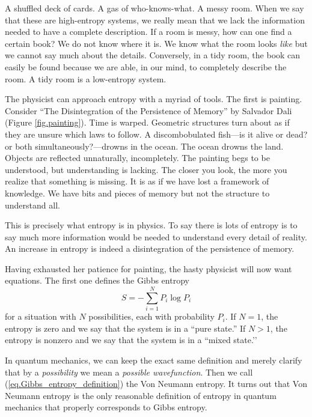 
A shuffled deck of cards. A gas of who-knows-what. A messy room. When we say that these are high-entropy systems, we really mean that we lack the information needed to have a complete description. If a room is messy, how can one find a certain book? We do not know where it is. We know what the room looks \emph{like} but we cannot say much about the details. Conversely, in a tidy room, the book can easily be found because we are able, in our mind, to completely describe the room. A tidy room is a low-entropy system.

The physicist can approach entropy with a myriad of tools. The first is painting. Consider “The Disintegration of the Persistence of Memory” by Salvador Dali (Figure \ref{fig.painting}). Time is warped. Geometric structures turn about as if they are unsure which laws to follow. A discombobulated fish—is it alive or dead? or both simultaneously?—drowns in the ocean. The ocean drowns the land. Objects are reflected unnaturally, incompletely. The painting begs to be understood, but understanding is lacking. The closer you look, the more you realize that something is missing. It is as if we have lost a framework of knowledge. We have bits and pieces of memory but not the structure to understand all.

This is precisely what entropy is in physics. To say there is lots of entropy is to say much more information would be needed to understand every detail of reality. An increase in entropy is indeed a disintegration of the persistence of memory.

Having exhausted her patience for painting, the hasty physicist will now want equations. The first one defines the Gibbs entropy
\begin{equation}\label{eq.Gibbs_entropy_definition}
S = -\sum_{i=1}^N P_i \log P_i
\end{equation}
for a situation with \(N\) possibilities, each with probability \(P_i\). If \(N=1\), the entropy is zero and we say that the system is in a ``pure state.''  If \(N > 1\), the entropy is nonzero and we say that the system is in a ``mixed state.’’

In quantum mechanics, we can keep the exact same definition and merely clarify that by a \emph{possibility} we mean a \emph{possible wavefunction}. Then we call (\ref{eq.Gibbs_entropy_definition}) the Von Neumann entropy. It turns out that Von Neumann entropy is the only reasonable definition of entropy in quantum mechanics that properly corresponds to Gibbs entropy. \cite{heusler,bracken,donald}

